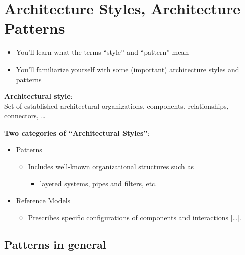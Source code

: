 \hypertarget{architecture-styles-architecture-patterns}{%
\section{Architecture Styles, Architecture
Patterns}\label{architecture-styles-architecture-patterns}}

\begin{tcolorbox}[colback=blue!5!white,colframe=blue!75!black]
\begin{itemize}
    \item You’ll learn what the terms “style” and “pattern” mean
    \item You’ll familiarize yourself with some (important) architecture styles and patterns
\end{itemize}
\end{tcolorbox}


\textbf{Architectural style}:\\
Set of established architectural organizations, components,
relationships, connectors, \ldots{}

\textbf{Two categories of ``Architectural Styles''}:

\begin{itemize}
\tightlist
\item
  Patterns

  \begin{itemize}
  \tightlist
  \item
    Includes well-known organizational structures such as

    \begin{itemize}
    \tightlist
    \item
      layered systems, pipes and filters, etc.
    \end{itemize}
  \end{itemize}
\item
  Reference Models

  \begin{itemize}
  \tightlist
  \item
    Prescribes specific configurations of components and interactions
    {[}\ldots{}{]}.
  \end{itemize}
\end{itemize}

\hypertarget{patterns-in-general}{%
\subsection{Patterns in general}\label{patterns-in-general}}

